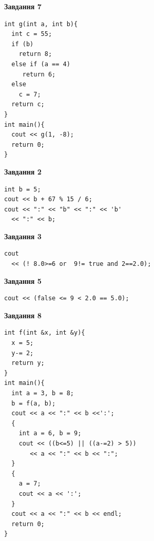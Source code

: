 \documentclass[12pt, ukrainian]{article}
\begin{document}
{\begin {large}
\begin{minipage}[t]{7.0cm}
\begin{center}
\textbf{Завдання 7}
\end{center}
\vspace{-8mm}

\begin{verbatim}
int g(int a, int b){
  int c = 55;
  if (b)
    return 8;
  else if (a == 4)
     return 6;
  else
    c = 7;
  return c;
}
int main(){
  cout << g(1, -8);
  return 0;
}
\end{verbatim}

\end{minipage}
\vline \hspace{1mm}
\begin{minipage}[t]{11.0cm}

\begin{center}
\textbf{Завдання 2}
\end{center}
\vspace{-8mm}

\begin{verbatim}
int b = 5;
cout << b + 67 % 15 / 6;
cout << ":" << "b" << ":" << 'b' 
  << ":" << b;
\end{verbatim}



\begin{center}
\textbf{Завдання 3}
\end{center}
\vspace{-8mm}

\begin{verbatim}
cout 
  << (! 8.0>=6 or  9!= true and 2==2.0);
\end{verbatim}



\begin{center}
\textbf{Завдання 5}
\end{center}
\vspace{-8mm}

\begin{verbatim}
cout << (false <= 9 < 2.0 == 5.0);
\end{verbatim}



\begin{center}
\textbf{Завдання 8}
\end{center}
\vspace{-8mm}

\begin{verbatim}
int f(int &x, int &y){
  x = 5;
  y-= 2;
  return y;
}
int main(){
  int a = 3, b = 8;
  b = f(a, b);
  cout << a << ":" << b <<':';
  {
    int a = 6, b = 9;
    cout << ((b<=5) || ((a-=2) > 5))
       << a << ":" << b << ":";
  }
  {
    a = 7;
    cout << a << ':';
  }
  cout << a << ":" << b << endl;
  return 0;
}
\end{verbatim}


\end{minipage}
\end{large}}
\end{document}
